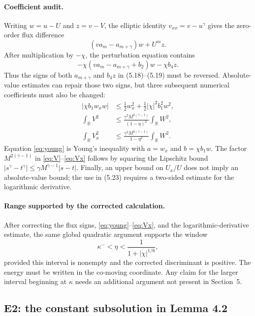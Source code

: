 \documentclass[11pt]{article}
\newcommand{\R}{\mathbb{R}}
\newcommand{\abs}[1]{\left\lvert #1\right\rvert}
\begin{document}
\paragraph{Coefficient audit.}
Writing \(w=u-U\) and \(z=v-V\), the elliptic identity
\(v_{xx}=v-u^\gamma\) gives the zero-order flux difference
\[
  (v a_m-a_{m+\gamma})w+U^m z.
\]
After multiplication by \(-\chi\), the perturbation equation contains
\[
 -\chi(v a_m-a_{m+\gamma}+b_2)w-\chi b_4z.
\]
Thus the signs of both \(a_{m+\gamma}\) and \(b_4z\) in (5.18)--(5.19)
must be reversed.  Absolute-value estimates can repair those two signs, but
three subsequent numerical coefficients must also be changed:
\begin{align}
 \abs{\chi b_1w_xw}
 &\le \frac12w_x^2+\frac12\abs{\chi}^2b_1^2w^2,
                                                               \label{eq:young}\\
 \int_\R V^2
 &\le\frac{\gamma^2M^{2(\gamma-1)}}{(1-\eta)^2}
       \int_\R W^2,                                           \label{eq:V}\\
 \int_\R V_x^2
 &\le\frac{\gamma^2M^{2(\gamma-1)}}{1-\eta^2}
       \int_\R W^2.                                           \label{eq:Vx}
\end{align}
Equation \eqref{eq:young} is Young's inequality with
\(a=w_x\) and \(b=\chi b_1w\).  The factor
\(M^{2(\gamma-1)}\) in \eqref{eq:V}--\eqref{eq:Vx} follows by squaring the
Lipschitz bound
\(\abs{s^\gamma-t^\gamma}\le\gamma M^{\gamma-1}\abs{s-t}\).
Finally, an upper bound on \(U_x/U\) does not imply an absolute-value bound;
the use in (5.23) requires a two-sided estimate for the logarithmic
derivative.

\paragraph{Range supported by the corrected calculation.}
After correcting the flux signs, \eqref{eq:young}--\eqref{eq:Vx}, and the
logarithmic-derivative estimate, the same global quadratic argument supports
the window
\[
  \kappa^-<\eta<
  \frac{1}{1+\abs{\chi}^{1/6}},
\]
provided this interval is nonempty and the corrected discriminant is
positive.  The energy must be written in the co-moving coordinate.  Any
claim for the larger interval beginning at \(\kappa\) needs an additional
argument not present in Section~5.

\subsection{E2: the constant subsolution in Lemma 4.2}
\end{document}
